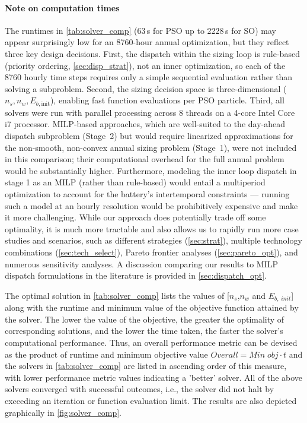 \documentclass[final,3p,times]{elsarticle}
\begin{document}
\paragraph{Note on computation times}
The runtimes in \cref{tab:solver_comp} (63\,s for PSO up to 2228\,s for SO) may appear surprisingly low for an 8760-hour annual optimization, but they reflect three key design decisions. First, the dispatch within the sizing loop is rule-based (priority ordering, \cref{sec:disp_strat}), not an inner optimization, so each of the 8760 hourly time steps requires only a simple sequential evaluation rather than solving a subproblem. Second, the sizing decision space is three-dimensional ($n_s, n_w, E_{b,\text{init}}$), enabling fast function evaluations per PSO particle. Third, all solvers were run with parallel processing across 8 threads on a 4-core Intel Core i7 processor. MILP-based approaches, which are well-suited to the day-ahead dispatch subproblem (Stage~2) but would require linearized approximations for the non-smooth, non-convex annual sizing problem (Stage~1), were not included in this comparison; their computational overhead for the full annual problem would be substantially higher. Furthermore, modeling the inner loop dispatch in stage 1 as an MILP (rather than rule-based) would entail a multiperiod optimization to account for the battery's intertemporal constraints --- running such a model at an hourly resolution would be prohibitively expensive and make it more challenging. While our approach does potentially trade off some optimality, it is much more tractable and also allows us to rapidly run more case studies and scenarios, such as different strategies (\cref{sec:strat}), multiple technology combinations (\cref{sec:tech_select}), Pareto frontier analyses (\cref{sec:pareto_opt}), and numerous sensitivity analyses. A discussion comparing our results to MILP dispatch formulations in the literature is provided in \cref{sec:dispatch_opt}.

The optimal solution in \cref{tab:solver_comp} lists the values of [$n_s$,$n_w$ and $E_{b,\;init}$] along with the runtime and minimum value of the objective function attained by the solver. The lower the value of the objective, the greater the optimality of corresponding solutions, and the lower the time taken, the faster the solver's computational performance. Thus, an overall performance metric can be devised as the product of runtime and minimum objective value $Overall = Min \; obj \cdot t$ and the solvers in \cref{tab:solver_comp} are listed in ascending order of this measure, with lower performance metric values indicating a 'better' solver. All of the above solvers converged with successful outcomes, i.e., the solver did not halt by exceeding an iteration or function evaluation limit. The results are also depicted graphically in \cref{fig:solver_comp}.
\end{document}
